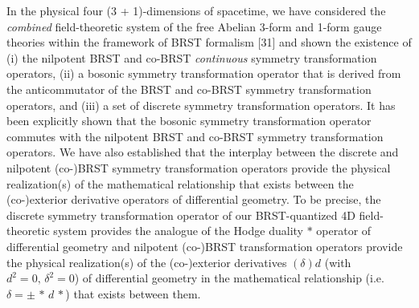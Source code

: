 \documentclass[12pt]{article}
\begin{document}
In the physical four (3 + 1)-dimensions of spacetime, we have considered the {\it combined} field-theoretic system of the free Abelian 3-form and 1-form gauge theories within the framework of BRST formalism [31] and shown the existence of (i) the nilpotent BRST and co-BRST 
{\it continuous} symmetry transformation operators, (ii)
a bosonic symmetry transformation operator that is derived from the anticommutator of the BRST and co-BRST symmetry transformation operators, and (iii) a
set of discrete symmetry transformation operators.  It has been explicitly shown that the bosonic symmetry transformation operator commutes with the nilpotent BRST and co-BRST symmetry transformation operators. We have also
established that the interplay between the discrete and nilpotent  (co-)BRST symmetry transformation operators provide the physical
realization(s) of the mathematical relationship that exists between the  (co-)exterior derivative operators of differential geometry. To
be precise, the discrete symmetry transformation operator of our BRST-quantized 4D field-theoretic system provides the analogue of the
Hodge duality $*$ operator of differential geometry and nilpotent (co-)BRST transformation operators provide the physical realization(s) of the
(co-)exterior derivatives $(\delta)d$ (with $d^2 = 0, \,\delta^2 = 0 $) of differential geometry in the mathematical relationship 
(i.e. $\delta = \pm\, *\, d\, * $) that exists between them.  
\end{document}
